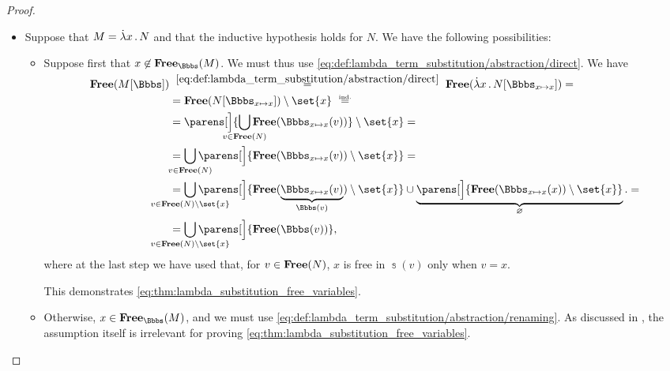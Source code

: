 \begin{proof}
\begin{itemize}
    \item Suppose that \( M = \qabs x N \) and that the inductive hypothesis holds for \( N \). We have the following possibilities:
    \begin{itemize}
      \item Suppose first that \( x \not\in \op*{Free}_\Bbbs(M) \). We must thus use \eqref{eq:def:lambda_term_substitution/abstraction/direct}. We have
      \begin{align*}
        \op*{Free}(M[\Bbbs])
        &\reloset{\eqref{eq:def:lambda_term_substitution/abstraction/direct}} =
        \op*{Free}(\qabs x N[\Bbbs_{x \mapsto x}])
        = \\ &=
        \op*{Free}(N[\Bbbs_{x \mapsto x}]) \setminus \set{ x }
        \reloset{\T{ind.}} = \\ &=
        \parens[\Big]{ \bigcup_{\mathclap{v \in \op*{Free}(N)}} \op*{Free}(\Bbbs_{x \mapsto x}(v)) } \setminus \set{ x }
        = \\ &=
        \bigcup_{\mathclap{v \in \op*{Free}(N)}} \parens[\Big]{ \op*{Free}(\Bbbs_{x \mapsto x}(v)) \setminus \set{ x } }
        = \\ &=
        \bigcup_{\mathclap{v \in \op*{Free}(N) \setminus \set{ x }}} \parens[\Big]{ \op*{Free}(\underbrace{\Bbbs_{x \mapsto x}(v)}_{\Bbbs(v)}) \setminus \set{ x } } \cup \underbrace{\parens[\Big]{ \op*{Free}(\Bbbs_{x \mapsto x}(x)) \setminus \set{ x } }}_\varnothing.
        = \\ &=
        \bigcup_{\mathclap{v \in \op*{Free}(N) \setminus \set{ x }}} \parens[\Big]{ \op*{Free}(\Bbbs(v)) },
      \end{align*}
      where at the last step we have used that, for \( v \in \op*{Free}(N) \), \( x \) is free in \( \Bbbs(v) \) only when \( v = x \).

      This demonstrates \eqref{eq:thm:lambda_substitution_free_variables}.

      \item Otherwise, \( x \in \op*{Free}_\Bbbs(M) \), and we must use \eqref{eq:def:lambda_term_substitution/abstraction/renaming}. As discussed in , the assumption itself is irrelevant for proving \eqref{eq:thm:lambda_substitution_free_variables}.


\end{itemize}
\end{itemize}
\end{proof}

